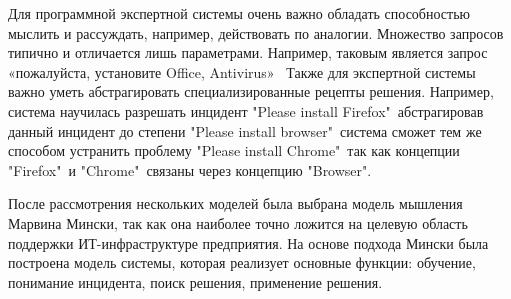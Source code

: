 Для программной экспертной системы очень важно обладать способностью мыслить и рассуждать, например, действовать по аналогии. Множество запросов типично и отличается лишь параметрами. Например, таковым является запрос «пожалуйста, установите Office, Antivirus» \etc\ Также для экспертной системы важно уметь абстрагировать специализированные рецепты решения. Например, система научилась разрешать инцидент "Please install Firefox"\comma\ абстрагировав данный инцидент до степени "Please install browser"\comma\ система сможет тем же способом устранить проблему "Please install Chrome"\comma\ так как концепции "Firefox"\ и "Chrome"\ связаны через концепцию "Browser". \par
После рассмотрения нескольких моделей была выбрана модель мышления Марвина Мински, так как она наиболее точно ложится на целевую область поддержки ИТ-инфраструктуре предприятия. На основе подхода Мински была построена модель системы, которая реализует основные функции: обучение, понимание инцидента, поиск решения, применение решения. 


